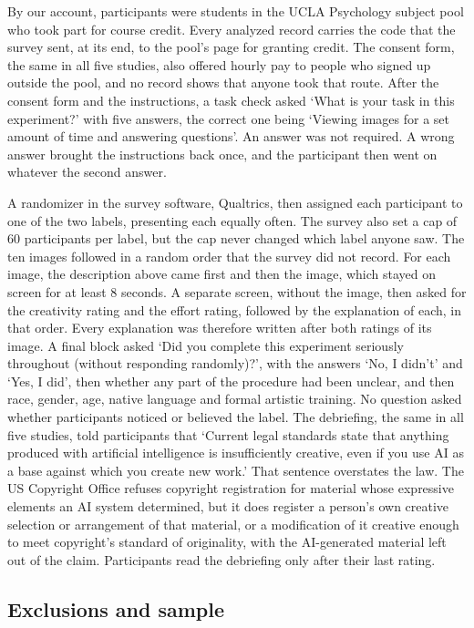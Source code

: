 By our account, participants were students in the UCLA Psychology subject pool who took part for course credit. Every analyzed record carries the code that the survey sent, at its end, to the pool's page for granting credit. The consent form, the same in all five studies, also offered hourly pay to people who signed up outside the pool, and no record shows that anyone took that route. After the consent form and the instructions, a task check asked `What is your task in this experiment?' with five answers, the correct one being `Viewing images for a set amount of time and answering questions'. An answer was not required. A wrong answer brought the instructions back once, and the participant then went on whatever the second answer.

A randomizer in the survey software, Qualtrics, then assigned each participant to one of the two labels, presenting each equally often. The survey also set a cap of 60 participants per label, but the cap never changed which label anyone saw. The ten images followed in a random order that the survey did not record. For each image, the description above came first and then the image, which stayed on screen for at least 8 seconds. A separate screen, without the image, then asked for the creativity rating and the effort rating, followed by the explanation of each, in that order. Every explanation was therefore written after both ratings of its image. A final block asked `Did you complete this experiment seriously throughout (without responding randomly)?', with the answers `No, I didn't' and `Yes, I did', then whether any part of the procedure had been unclear, and then race, gender, age, native language and formal artistic training. No question asked whether participants noticed or believed the label. The debriefing, the same in all five studies, told participants that `Current legal standards state that anything produced with artificial intelligence is insufficiently creative, even if you use AI as a base against which you create new work.' That sentence overstates the law. The US Copyright Office refuses copyright registration for material whose expressive elements an AI system determined, but it does register a person's own creative selection or arrangement of that material, or a modification of it creative enough to meet copyright's standard of originality, with the AI-generated material left out of the claim.\cite{usco2023guidance,usco2025copyrightability} Participants read the debriefing only after their last rating.

\subsection*{Exclusions and sample}

